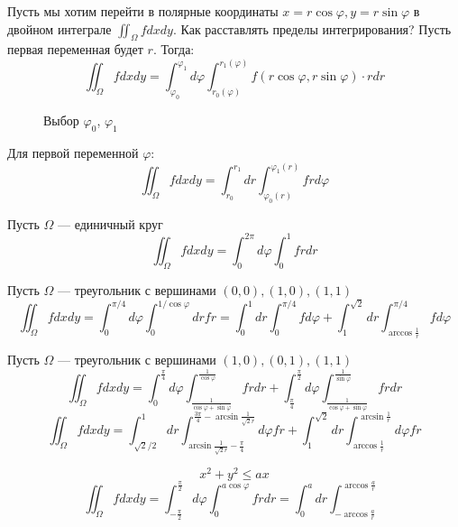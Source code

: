 

\cfoot{}



Пусть мы хотим перейти в полярные координаты \(x = r\cos \varphi, y = r \sin \varphi\) в двойном интеграле \(\iint_\Omega f dx dy\). Как расставлять пределы интегрирования? Пусть первая переменная будет \(r\). Тогда:
\[\iint_\Omega f dx dy = \int_{\varphi_0}^{\varphi_1} d\varphi \int_{r_0(\varphi)}^{r_1(\varphi)} f(r\cos \varphi, r\sin \varphi) \cdot r dr\]

\begin{figure}[h]
    \centering
    
    \caption{Выбор \(\varphi_0\), \(\varphi_1\)}
\end{figure}

Для первой переменной \(\varphi\):
\[\iint_\Omega f dx dy = \int_{r_0}^{r_1} dr \int_{\varphi_0(r)}^{\varphi_1(r)} f r d\varphi\]

\begin{exercise}
    Пусть \(\Omega\) --- единичный круг
    \[\iint_\Omega f dx dy = \int_0^{2\pi} d\varphi \int_0^1 f r dr\]
\end{exercise}

\begin{exercise}
    Пусть \(\Omega\) --- треугольник с вершинами \((0, 0), (1, 0), (1, 1)\)
    \[\iint_\Omega f dx dy = \int_0^{\pi / 4} d\varphi \int_{0}^{1 / \cos \varphi} dr f r = \int_0^{1} dr \int_{0}^{\pi / 4} f d\varphi + \int_1^{\sqrt{2}} dr \int_{\arccos \frac{1}{r}}^{\pi / 4} f d\varphi\]
\end{exercise}

\begin{exercise}
    Пусть \(\Omega\) --- треугольник с вершинами \((1, 0), (0, 1), (1, 1)\)
    \[\iint_\Omega f dx dy = \int_{0}^{\frac{\pi}{4}} d\varphi \int_{\frac{1}{\cos \varphi + \sin \varphi}}^{\frac{1}{\cos \varphi}} f r dr + \int_{\frac{\pi}{4}}^{\frac{\pi}{2}} d\varphi \int_{\frac{1}{\cos \varphi + \sin \varphi}}^{\frac{1}{\sin \varphi}} f r dr\]
    \[\iint_\Omega f dx dy = \int_{\sqrt{2} / 2}^1 dr \int_{\arcsin \frac{1}{\sqrt{2}r} -\frac{\pi}{4}}^{{\frac{3\pi}{4} - \arcsin \frac{1}{\sqrt{2}r}}} d\varphi fr + \int_1^{\sqrt{2}} dr \int_{\arccos \frac{1}{r}}^{\arcsin \frac{1}{r}} d\varphi fr\]
\end{exercise}

\begin{exercise}
    \[x^2 + y^2 \leq ax\]
    \[\iint_\Omega f dx dy = \int_{ -\frac{\pi}{2}}^{\frac{\pi}{2}} d \varphi \int_0^{a\cos \varphi} f rdr = \int_0^a  dr \int_{ -\arccos \frac{a}{r} }^{\arccos \frac{a}{r}}\]
\end{exercise}

